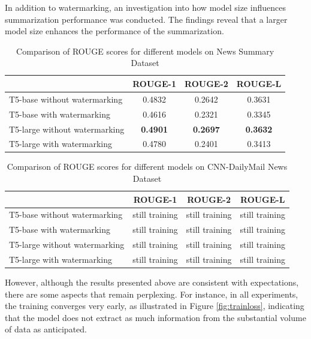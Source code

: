 \documentclass{article}
\begin{document}
In addition to watermarking, an investigation into how model size influences summarization performance was conducted. The findings reveal that a larger model size enhances the performance of the summarization.\\

\begin{table}[h]
	\centering
	\begin{tabular}{lccc}
		\hline
		& ROUGE-1 & ROUGE-2 & ROUGE-L \\
		\hline
		T5-base without watermarking  &  0.4832 &  0.2642 &  0.3631 \\
		T5-base with watermarking     &  0.4616 &  0.2321 &  0.3345 \\
		T5-large without watermarking &  \textbf{0.4901} &  \textbf{0.2697} &  \textbf{0.3632} \\
		T5-large with watermarking    &  0.4780 &  0.2401 &  0.3413 \\
		\hline
	\end{tabular}
	\caption{Comparison of ROUGE scores for different models on News Summary Dataset}
	\label{tab:rouge-scores_news}
\end{table}

\begin{table}[h]
	\centering
	\begin{tabular}{lccc}
		\hline
		& ROUGE-1 & ROUGE-2 & ROUGE-L \\
		\hline
		T5-base without watermarking  &  still training &  still training &  still training \\
		T5-base with watermarking     &  still training &  still training &  still training \\
		T5-large without watermarking &  still training &  still training &  still training \\
		T5-large with watermarking    &  still training &  still training &  still training \\
		\hline
	\end{tabular}
	\caption{Comparison of ROUGE scores for different models on CNN-DailyMail News Dataset}
	\label{tab:rouge-scores_cnn}
\end{table}

However, although the results presented above are consistent with expectations, there are some aspects that remain perplexing. For instance, in all experiments, the training converges very early, as illustrated in Figure \ref{fig:trainloss}, indicating that the model does not extract as much information from the substantial volume of data as anticipated.
\end{document}
